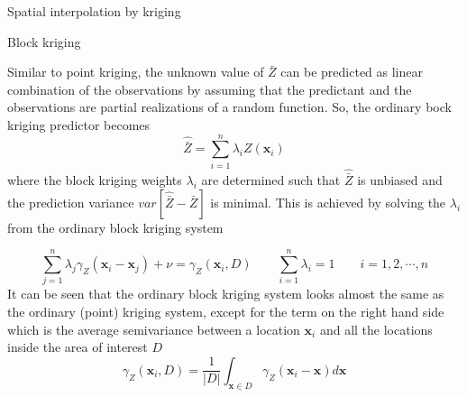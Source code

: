 \documentclass[8pt]{beamer}
\renewcommand{\emph}[1]{\textcolor{myorange}{#1}}
\begin{document}
  \begin{frame}{Spatial interpolation by kriging}
     \begin{block}{Block kriging}
    \end{block}
    Similar to \emph{point kriging}, the unknown value of $\bar{Z}$ can be predicted as linear combination of the observations by assuming that the predictant and the observations are partial realizations of a \emph{random function}. So, the \emph{ordinary bock kriging predictor} becomes
    \begin{equation}
        \hat{\bar{Z}} = \sum_{i=1}^n \lambda_i Z(\mathbf{x}_i)
        \label{e724}
    \end{equation}
    where the \emph{block kriging weights} $\lambda_i$ are determined such that $\hat{\bar{Z}}$ is unbiased and the prediction variance $var\left[\hat{\bar{Z}} - \bar{Z} \right]$ is minimal. This is achieved by solving the $\lambda_i$  from the \emph{ordinary block kriging system}

    \begin{equation}
        \sum_{j=1}^n \lambda_j \gamma_Z (\mathbf{x}_i - \mathbf{x}_j) + \nu = \gamma_Z (\mathbf{x}_i, D) \quad \quad \sum_{i=1}^n \lambda_i = 1 \quad \quad i=1,2,\cdots,n 
        \label{e725}
    \end{equation}
    It can be seen that the \emph{ordinary block kriging system} looks almost the same as the \emph{ordinary (point) kriging system}, except for the term on the right hand side which is the average \emph{semivariance} between a location $\mathbf{x}_i$ and all the locations inside the area of interest $D$
    \vspace{-5pt}
    \begin{equation}
        \gamma_Z (\mathbf{x}_i, D) = \frac{1}{|D|} \int_{\mathbf{x} \in D} \gamma_Z (\mathbf{x}_i - \mathbf{x}) d\mathbf{x}
        \label{e726}
    \end{equation}
   \end{frame}
\end{document}
